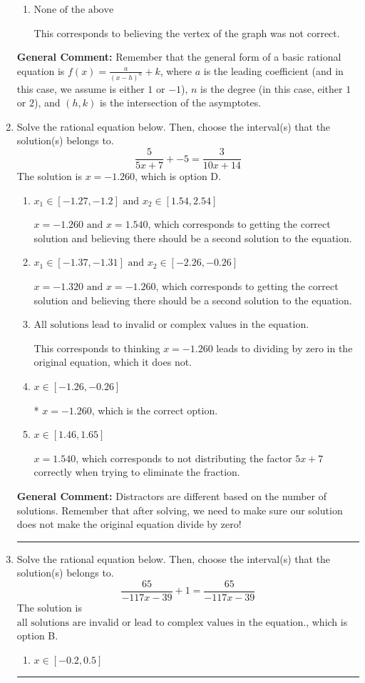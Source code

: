 \documentclass{extbook}[14pt]
\newcommand{\litem}[1]{\item #1

\rule{\textwidth}{0.4pt}}
\begin{document}
\begin{enumerate}
{\begin{enumerate}[label=\Alph*.]
This is the correct option.
\item \( \text{None of the above} \)

This corresponds to believing the vertex of the graph was not correct.
\end{enumerate}

\textbf{General Comment:} Remember that the general form of a basic rational equation is $ f(x) = \frac{a}{(x-h)^n} + k$, where $a$ is the leading coefficient (and in this case, we assume is either $1$ or $-1$), $n$ is the degree (in this case, either $1$ or $2$), and $(h, k)$ is the intersection of the asymptotes.
}
\litem{
Solve the rational equation below. Then, choose the interval(s) that the solution(s) belongs to.
\[ \frac{5}{5x + 7} + -5 = \frac{3}{10x + 14} \]The solution is \( x = -1.260 \), which is option D.\begin{enumerate}[label=\Alph*.]
\item \( x_1 \in [-1.27, -1.2] \text{ and } x_2 \in [1.54,2.54] \)

$x = -1.260 \text{ and } x = 1.540$, which corresponds to getting the correct solution and believing there should be a second solution to the equation.
\item \( x_1 \in [-1.37, -1.31] \text{ and } x_2 \in [-2.26,-0.26] \)

$x = -1.320 \text{ and } x = -1.260$, which corresponds to getting the correct solution and believing there should be a second solution to the equation.
\item \( \text{All solutions lead to invalid or complex values in the equation.} \)

This corresponds to thinking $x = -1.260$ leads to dividing by zero in the original equation, which it does not.
\item \( x \in [-1.26,-0.26] \)

* $x = -1.260$, which is the correct option.
\item \( x \in [1.46,1.65] \)

$x = 1.540$, which corresponds to not distributing the factor $5x + 7$ correctly when trying to eliminate the fraction.
\end{enumerate}

\textbf{General Comment:} Distractors are different based on the number of solutions. Remember that after solving, we need to make sure our solution does not make the original equation divide by zero!
}
\litem{
Solve the rational equation below. Then, choose the interval(s) that the solution(s) belongs to.
\[ \frac{65}{-117x -39} + 1 = \frac{65}{-117x -39} \]The solution is \( \text{all solutions are invalid or lead to complex values in the equation.} \), which is option B.\begin{enumerate}[label=\Alph*.]
\item \( x \in [-0.2,0.5] \)


\end{enumerate}}
\end{enumerate}
\end{document}

